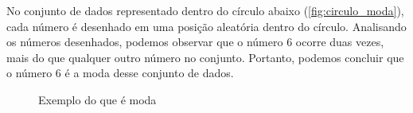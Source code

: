 No conjunto de dados representado dentro do círculo abaixo (\ref{fig:circulo_moda}), cada número é desenhado em uma posição aleatória dentro do círculo. Analisando os números desenhados, podemos observar que o número 6 ocorre duas vezes, mais do que qualquer outro número no conjunto. Portanto, podemos concluir que o número 6 é a moda desse conjunto de dados.

\begin{figure}[H]
    \centering
    \caption{Exemplo do que é moda}
\end{figure}
